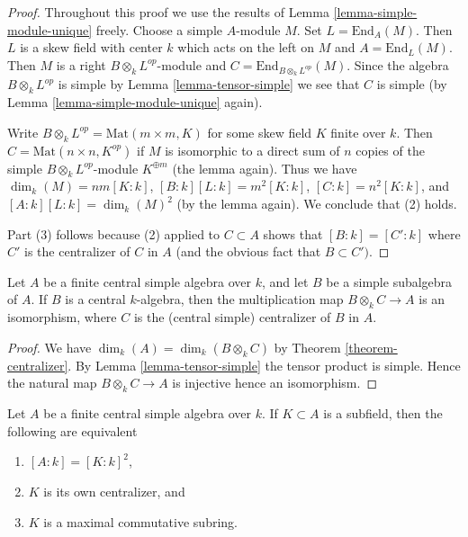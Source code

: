 \begin{proof}
Throughout this proof we use the results of
Lemma \ref{lemma-simple-module-unique} freely.
Choose a simple $A$-module $M$. Set $L = \text{End}_A(M)$.
Then $L$ is a skew field with center $k$ which acts on the left on $M$
and $A = \text{End}_L(M)$.
Then $M$ is a right $B \otimes_k L^{op}$-module and
$C = \text{End}_{B \otimes_k L^{op}}(M)$.
Since the algebra $B \otimes_k L^{op}$ is simple by
Lemma \ref{lemma-tensor-simple} we see that $C$ is simple (by
Lemma \ref{lemma-simple-module-unique} again).

\medskip\noindent
Write $B \otimes_k L^{op} = \text{Mat}(m \times m, K)$ for some
skew field $K$ finite over $k$. Then $C = \text{Mat}(n \times n, K^{op})$
if $M$ is isomorphic to a direct sum of $n$ copies of the simple
$B \otimes_k L^{op}$-module $K^{\oplus m}$ (the lemma again). Thus we have
$\dim_k(M) = nm [K : k]$, $[B : k] [L : k] = m^2 [K : k]$,
$[C : k] = n^2 [K : k]$, and $[A : k] [L : k] = \dim_k(M)^2$ (by
the lemma again). We conclude that (2) holds.

\medskip\noindent
Part (3) follows because (2) applied to $C \subset A$ shows
that $[B : k] = [C' : k]$ where $C'$ is the centralizer of $C$ in $A$
(and the obvious fact that $B \subset C')$.
\end{proof}

\begin{lemma}
\label{lemma-when-tensor-is-equal}
Let $A$ be a finite central simple algebra over $k$, and let
$B$ be a simple subalgebra of $A$. If $B$ is a central
$k$-algebra, then the multiplication map $B \otimes_k C \to A$ is an isomorphism,
where $C$ is the (central simple)
centralizer of $B$ in $A$.
\end{lemma}

\begin{proof}
We have $\dim_k(A) = \dim_k(B \otimes_k C)$ by
Theorem \ref{theorem-centralizer}. By
Lemma \ref{lemma-tensor-simple}
the tensor product is simple. Hence the natural map
$B \otimes_k C \to A$ is injective hence an isomorphism.
\end{proof}

\begin{lemma}
\label{lemma-self-centralizing-subfield}
Let $A$ be a finite central simple algebra over $k$.
If $K \subset A$ is a subfield, then the following are equivalent
\begin{enumerate}
\item $[A : k] = [K : k]^2$,
\item $K$ is its own centralizer, and
\item $K$ is a maximal commutative subring.
\end{enumerate}
\end{lemma}

